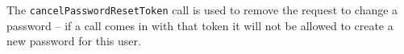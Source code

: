 The \verb+cancelPasswordResetToken+ call is used to remove the request to change a password -- if a call comes in with that
token it will not be allowed to create a new password for this user.
